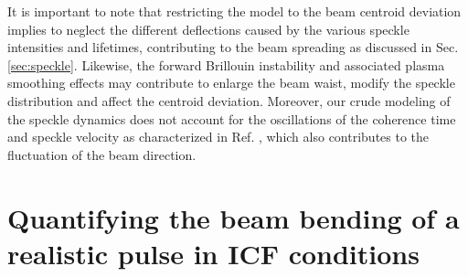 \documentclass[%
 reprint,
 amsmath,amssymb,
 aps,
]{revtex4-1}
\begin{document}
It is important to note that restricting the model to the  beam centroid deviation implies to neglect the  different deflections caused by  the various speckle intensities  and lifetimes,  contributing to the beam spreading as discussed in Sec. \ref{sec:speckle}. Likewise, the forward Brillouin instability \cite[]{POP_Grech_2006,PRL_Grech_2009,phd-Grech} and associated plasma smoothing effects may contribute to enlarge the beam waist, modify the speckle distribution and affect the centroid deviation. 
Moreover, our crude modeling of the speckle dynamics does not  account for the oscillations of the coherence time and speckle velocity  as characterized in Ref. \cite[]{POP_Cain_Riazuelo_2012}, which also contributes to the fluctuation  of the beam direction. 

\section{Quantifying the beam bending of a  realistic pulse in  ICF conditions}\label{sec:icf}
\end{document}
